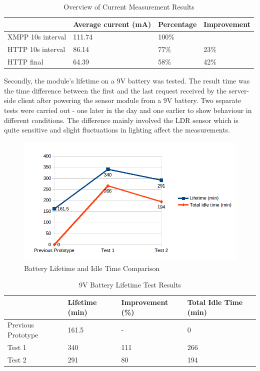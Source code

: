 \begin{table}[h]
\centering
  \begin{tabular}{|l|l|l|l|}
    \hline
     & Average current (mA) & Percentage & Improvement \\ \hline
    XMPP 10s interval & 111.74 & 100\% & \\ \hline
    HTTP 10s interval & 86.14 & 77\% & 23\% \\ \hline
    HTTP final & 64.39 & 58\% & 42\% \\
    \hline
  \end{tabular}
\caption{Overview of Current Measurement Results}
\label{current_measurements_table}
\end{table}

Secondly, the module's lifetime on a 9V battery was tested. The result time was the time difference between the first and the last request received by the server-side client after powering the sensor module from a 9V battery. Two separate tests were carried out - one later in the day and one earlier to show behaviour in different conditions. The difference mainly involved the LDR sensor which is quite sensitive and slight fluctuations in lighting affect the measurements. 

\begin{figure}[h!]
\centering
\includegraphics[scale=0.9]{4/figures/9V_test_results.png}
\caption{Battery Lifetime and Idle Time Comparison}
\label{9V_test_results}
\end{figure}

\begin{table}[h]
\centering
  \begin{tabular}{|l|l|l|l|}
    \hline
     & Lifetime (min) & Improvement (\%) & Total Idle Time (min)\\ \hline
    Previous Prototype & 161.5 & - & 0\\ \hline
    Test 1 & 340 & 111 & 266 \\ \hline
    Test 2 & 291 & 80 & 194 \\ \hline
  \end{tabular}
\caption{9V Battery Lifetime Test Results}
\label{9V_measurements_table}
\end{table}

